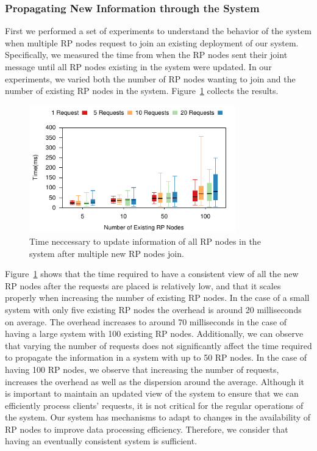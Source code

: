 \subsubsection{Propagating New Information through the System}

First we performed a set of experiments to understand the behavior of the system when multiple RP nodes request to join an existing deployment of our system. Specifically, we measured the time from when the RP nodes sent their joint message until all RP nodes existing in the system were updated. In our experiments, we varied both the number of RP nodes wanting to join and the number of existing RP nodes in the system. Figure~\ref{fig:rpDiscovery} collects the results.

\begin{figure}[htb!]
  \centering
    \includegraphics[width=0.8\textwidth]{Figures/rpDiscoveryBox.pdf}
  \caption{Time neccessary to update information of all RP nodes in the system after multiple new RP nodes join.} \label{fig:rpDiscovery}
\end{figure}

Figure~\ref{fig:rpDiscovery} shows that the time required to have a consistent view of all the new RP nodes after the requests are placed is relatively low, and that it scales properly when increasing the number of existing RP nodes. In the case of a small system with only five existing RP nodes the overhead is around 20 milliseconds on average. The overhead increases to around 70 milliseconds in the case of having a large system with 100 existing RP nodes. Additionally, we can observe that varying the number of requests does not significantly affect the time required to propagate the information in a system with up to 50 RP nodes. In the case of having 100 RP nodes, we observe that increasing the number of requests, increases the overhead as well as the dispersion around the average. Although it is important to maintain an updated view of the system to ensure that we can efficiently process clients' requests, it is not critical for the regular operations of the system. Our system has mechanisms to adapt to changes in the availability of RP nodes to improve data processing efficiency. Therefore, we consider that having an eventually consistent system is sufficient. 

